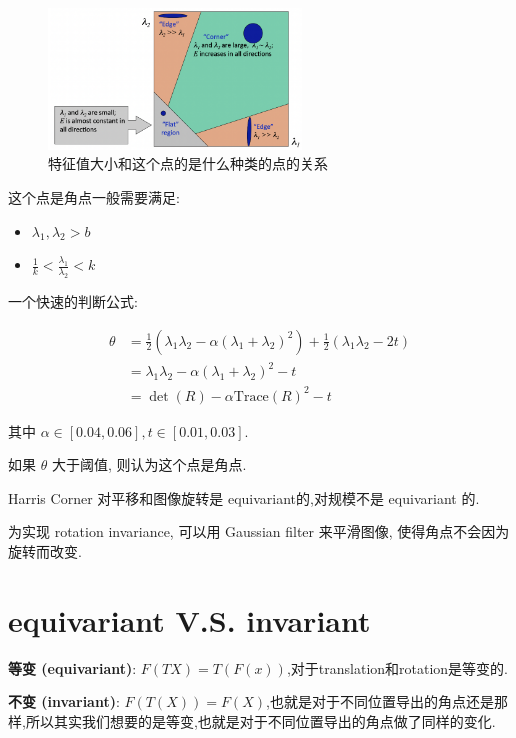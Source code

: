 \begin{figure}[htbp]
    \centering
    \includegraphics[width=0.6\textwidth]{figures/corner_map.png}
    \caption{特征值大小和这个点的是什么种类的点的关系}
\end{figure}
\begin{proposition}
    

这个点是角点一般需要满足:

\begin{itemize}
    \item $\lambda_1, \lambda_2>b$
    \item $\frac{1}{k}<\frac{\lambda_1}{\lambda_2}<k$
\end{itemize}

一个快速的判断公式:

\begin{equation}
\begin{aligned}
\theta&=\frac 12(\lambda_1\lambda_2-\alpha(\lambda_1+\lambda_2)^2)+\frac12(\lambda_1\lambda_2-2t)\\
&=\lambda_1\lambda_2-\alpha(\lambda_1+\lambda_2)^2-t\\
&=\det(R)-\alpha\text{Trace}(R)^2-t
\end{aligned}
\end{equation}

其中 $\alpha\in[0.04,0.06], t\in[0.01,0.03]$.

如果 $\theta$ 大于阈值, 则认为这个点是角点.
\end{proposition}
\begin{note}
Harris Corner 对平移和图像旋转是 equivariant的,对规模不是 equivariant 的.

为实现 rotation invariance, 可以用 Gaussian filter 来平滑图像, 使得角点不会因为旋转而改变.
\end{note}
\section{equivariant V.S. invariant}
\begin{definition}
    

\textbf{等变 (equivariant)}: $F(TX)=T(F(x))$,对于translation和rotation是等变的.

\textbf{不变 (invariant)}: $F(T(X))=F(X)$,也就是对于不同位置导出的角点还是那样,所以其实我们想要的是等变,也就是对于不同位置导出的角点做了同样的变化.
\end{definition}

